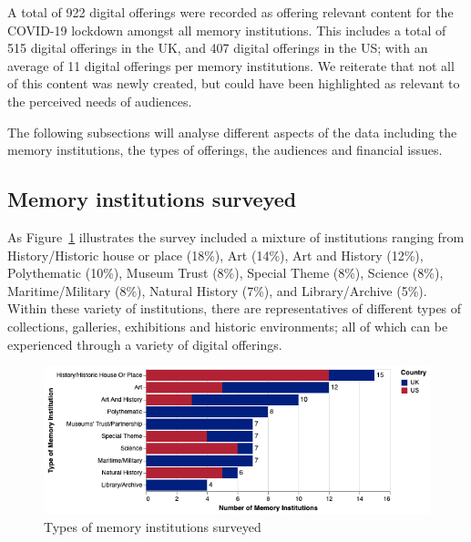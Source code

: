 \documentclass{egpubl}
\begin{document}
A total of 922 digital offerings were recorded as offering relevant content for the COVID-19 lockdown amongst all memory institutions. This includes a total of 515 digital offerings in the UK, and 407 digital offerings in the US; with an average of 11 digital offerings per memory institutions. We reiterate that not all of this content was newly created, but could have been highlighted as relevant to the perceived needs of audiences. 


The following subsections will analyse different aspects of the data including the memory institutions, the types of offerings, the audiences and financial issues.

\subsection{Memory institutions surveyed}
As Figure~\ref{fig:MType} illustrates the survey included a mixture of institutions ranging from History/Historic house or place (18\%), Art (14\%), Art and History (12\%), Polythematic (10\%), Museum Trust (8\%), Special Theme (8\%), Science (8\%), Maritime/Military (8\%), Natural History (7\%), and Library/Archive (5\%). Within these variety of institutions, there are representatives of different types of collections, galleries, exhibitions and historic environments; all of which can be experienced through a variety of digital offerings. 


\begin{figure}[h]
  \centering
  \includegraphics[width=\linewidth]{images/museumtype.png}
  \caption{\label{fig:MType}
           Types of memory institutions surveyed}
\end{figure}
\end{document}
